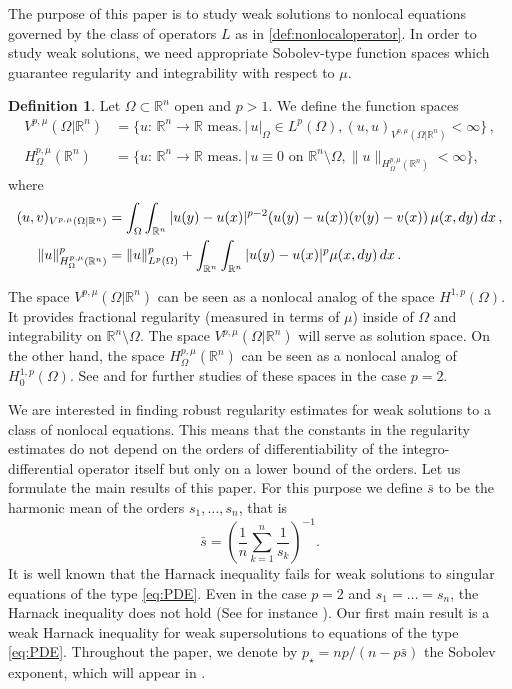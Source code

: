 \documentclass[11pt]{amsart}
\theoremstyle{plain}
\theoremstyle{definition}
\newtheorem{definition}[theorem]{Definition}
\numberwithin{equation}{section}
\renewcommand{\d}{\textnormal{d}}
\newcommand{\R}{\mathbb{R}}
\begin{document}
The purpose of this paper is to study weak solutions to nonlocal equations governed by the class of operators $L$ as in \eqref{def:nonlocaloperator}. In order to study weak solutions, we need appropriate Sobolev-type function spaces which guarantee regularity and integrability with respect to $\mu$.
\begin{definition}\label{VHomega}
Let $\Omega\subset\R^n$ open and $p> 1$. We define the function spaces
\begin{align*}  
  V^{p,\mu}(\Omega|\R^n)  &= \Big\{ u: \,\R^n\to\R \text{ meas.} \, | \, u\bigr|_{\Omega}\in 
L^p(\Omega), (u,u)_{V^{p,\mu}(\Omega|\R^n)} <\infty\Big\}\,, 
 \\
 H^{p,\mu}_{\Omega}(\R^n) &= \Big\{ u: \,\R^n\to\R \text{ meas.}  \, | \, u\equiv 0 \text{ on } 
\R^n\setminus\Omega, \|u\|_{H^{p,\mu}_{\Omega}(\R^n)}<\infty \Big\}, 
\end{align*}
where
\begin{align*}
(u,v)_{V^{p,\mu}(\Omega|\R^n)} &= \int_{\Omega}\int_{\R^n} 
|u(y) - u(x)|^{p-2}(u(y)-u(x))(v(y)-v(x))\, \mu(x,\d y)\, \d x \,, \\
\|u\|_{H^{p,\mu}_{\Omega}(\R^n)}^p &= \|u\|_{L^p(\Omega)}^p + 
\int_{\R^n}\int_{\R^n} |u(y)-u(x)|^p\mu(x,\d y)\,\d x \,.
\end{align*}
\end{definition}
The space $V^{p,\mu}(\Omega|\R^n)$ can be seen as a nonlocal analog of the space $H^{1,p}(\Omega)$. 
It provides fractional regularity (measured in terms of $\mu$) inside of $\Omega$ 
and integrability on $\R^n \setminus \Omega$. The space $V^{p,\mu}(\Omega|\R^n)$ will serve as solution space.
On the other hand, the space $H^{p,\mu}_{\Omega}(\R^n)$ can be seen as a nonlocal analog of 
$H^{1,p}_0(\Omega)$. See \cite{FKV15} and \cite{DyKa17} for further studies of 
these spaces in the case $p=2$. 

We are interested in finding robust regularity estimates for weak solutions to a class of nonlocal equations. This means that the constants in the regularity estimates do not depend on the orders of differentiability of the integro-differential operator itself but only on a lower bound of the orders. Let us formulate the main results of this paper. For this purpose we define $\bar{s}$ to be the harmonic mean of the orders $s_1,\dots,s_n$, that is
\begin{equation*}
 \bar{s} = \left(\frac{1}{n} \sum_{k=1}^n \frac{1}{s_k}\right)^{-1}.
\end{equation*}
It is well known that the Harnack inequality fails for weak solutions to singular equations of the type \eqref{eq:PDE}. 
Even in the case $p=2$ and $s_1=\dots=s_n$, the Harnack inequality does not hold (See for instance \cite{BoSz07, BaCh10}). Our first main result is a weak Harnack inequality for weak supersolutions to equations of the type \eqref{eq:PDE}. Throughout the paper, we denote by $p_{\star}=np/(n-p\bar{s})$ the Sobolev exponent, which will appear in .
\end{document}
